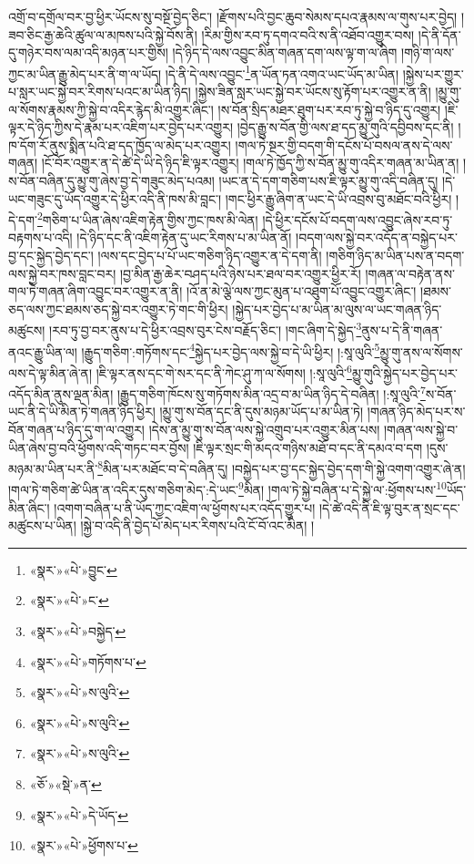 འགྲོ་བ་དགྲོལ་བར་བྱ་ཕྱིར་ཡོངས་སུ་བསྔོ་བྱེད་ཅིང་། །རྫོགས་པའི་བྱང་ཆུབ་སེམས་དཔའ་རྣམས་ལ་གུས་པར་བྱེད། །ཟབ་ཅིང་རྒྱ་ཆེའི་ཚུལ་ལ་མཁས་པའི་སྐྱེ་བོས་ནི། །རིམ་གྱིས་རབ་ཏུ་དགའ་བའི་ས་ནི་འཐོབ་འགྱུར་བས། །དེ་ནི་དོན་དུ་གཉེར་བས་ལམ་འདི་མཉན་པར་གྱིས། །དེ་ཉིད་དེ་ལས་འབྱུང་མིན་གཞན་དག་ལས་ལྟ་ག་ལ་ཞིག །གཉི་ག་ལས་ཀྱང་མ་ཡིན་རྒྱུ་མེད་པར་ནི་ག་ལ་ཡོད། །དེ་ནི་དེ་ལས་འབྱུང་\footnote{«སྣར་»«པེ་»བྱུང་}ན་ཡོན་ཏན་འགའ་ཡང་ཡོད་མ་ཡིན། །སྐྱེས་པར་གྱུར་པ་སླར་ཡང་སྐྱེ་བར་རིགས་པའང་མ་ཡིན་ཉིད། །སྐྱེས་ཟིན་སླར་ཡང་སྐྱེ་བར་ཡོངས་སུ་རྟོག་པར་འགྱུར་ན་ནི། །མྱུ་གུ་ལ་སོགས་རྣམས་ཀྱི་སྐྱེ་བ་འདིར་རྙེད་མི་འགྱུར་ཞིང་། །ས་བོན་སྲིད་མཐར་ཐུག་པར་རབ་ཏུ་སྐྱེ་བ་ཉིད་དུ་འགྱུར། །ཇི་ལྟར་དེ་ཉིད་ཀྱིས་དེ་རྣམ་པར་འཇིག་པར་བྱེད་པར་འགྱུར། །བྱེད་རྒྱུ་ས་བོན་གྱི་ལས་ཐ་དད་མྱུ་གུའི་དབྱིབས་དང་ནི། །ཁ་དོག་རོ་ནུས་སྨིན་པའི་ཐ་དད་ཁྱོད་ལ་མེད་པར་འགྱུར། །གལ་ཏེ་སྔར་གྱི་བདག་གི་དངོས་པོ་བསལ་ནས་དེ་ལས་གཞན། །ངོ་བོར་འགྱུར་ན་དེ་ཚེ་དེ་ཡི་དེ་ཉིད་ཇི་ལྟར་འགྱུར། །གལ་ཏེ་ཁྱོད་ཀྱི་ས་བོན་མྱུ་གུ་འདིར་གཞན་མ་ཡིན་ན། །ས་བོན་བཞིན་དུ་མྱུ་གུ་ཞེས་བྱ་དེ་གཟུང་མེད་པའམ། །ཡང་ན་དེ་དག་གཅིག་པས་ཇི་ལྟར་མྱུ་གུ་འདི་བཞིན་དུ། །དེ་ཡང་གཟུང་དུ་ཡོད་འགྱུར་དེ་ཕྱིར་འདི་ནི་ཁས་མི་བླང་། །གང་ཕྱིར་རྒྱུ་ཞིག་ན་ཡང་དེ་ཡི་འབྲས་བུ་མཐོང་བའི་ཕྱིར། །དེ་དག་\footnote{«སྣར་»«པེ་»ང་}གཅིག་པ་ཡིན་ཞེས་འཇིག་རྟེན་གྱིས་ཀྱང་ཁས་མི་ལེན། །དེ་ཕྱིར་དངོས་པོ་བདག་ལས་འབྱུང་ཞེས་རབ་ཏུ་བརྟགས་པ་འདི། །དེ་ཉིད་དང་ནི་འཇིག་རྟེན་དུ་ཡང་རིགས་པ་མ་ཡིན་ནོ། །བདག་ལས་སྐྱེ་བར་འདོད་ན་བསྐྱེད་པར་བྱ་དང་སྐྱེད་བྱེད་དང་། །ལས་དང་བྱེད་པ་པོ་ཡང་གཅིག་ཉིད་འགྱུར་ན་དེ་དག་ནི། །གཅིག་ཉིད་མ་ཡིན་པས་ན་བདག་ལས་སྐྱེ་བར་ཁས་བླང་བར། །བྱ་མིན་རྒྱ་ཆེར་བཤད་པའི་ཉེས་པར་ཐལ་བར་འགྱུར་ཕྱིར་རོ། །གཞན་ལ་བརྟེན་ནས་གལ་ཏེ་གཞན་ཞིག་འབྱུང་བར་འགྱུར་ན་ནི། །འོ་ན་མེ་ལྕེ་ལས་ཀྱང་མུན་པ་འཐུག་པོ་འབྱུང་འགྱུར་ཞིང་། །ཐམས་ཅད་ལས་ཀྱང་ཐམས་ཅད་སྐྱེ་བར་འགྱུར་ཏེ་གང་གི་ཕྱིར། །སྐྱེད་པར་བྱེད་པ་མ་ཡིན་མ་ལུས་ལ་ཡང་གཞན་ཉིད་མཚུངས། །རབ་ཏུ་བྱ་བར་ནུས་པ་དེ་ཕྱིར་འབྲས་བུར་ངེས་བརྗོད་ཅིང་། །གང་ཞིག་དེ་སྐྱེད་\footnote{«སྣར་»«པེ་»བསྐྱེད་}ནུས་པ་དེ་ནི་གཞན་ནའང་རྒྱུ་ཡིན་ལ། །རྒྱུད་གཅིག་:གཏོགས་དང་\footnote{«སྣར་»«པེ་»གཏོགས་པ་}སྐྱེད་པར་བྱེད་ལས་སྐྱེ་བ་དེ་ཡི་ཕྱིར། །:སཱ་ལུའི་\footnote{«སྣར་»«པེ་»ས་ལུའི་}མྱུ་གུ་ནས་ལ་སོགས་ལས་དེ་ལྟ་མིན་ཞེ་ན། །ཇི་ལྟར་ནས་དང་གེ་སར་དང་ནི་ཀེང་ཤུ་ཀ་ལ་སོགས། །:སཱ་ལུའི་\footnote{«སྣར་»«པེ་»ས་ལུའི་}མྱུ་གུའི་སྐྱེད་པར་བྱེད་པར་འདོད་མིན་ནུས་ལྡན་མིན། །རྒྱུད་གཅིག་ཁོངས་སུ་གཏོགས་མིན་འདྲ་བ་མ་ཡིན་ཉིད་དེ་བཞིན། །:སཱ་ལུའི་\footnote{«སྣར་»«པེ་»ས་ལུའི་}ས་བོན་ཡང་ནི་དེ་ཡི་མིན་ཏེ་གཞན་ཉིད་ཕྱིར། །མྱུ་གུ་ས་བོན་དང་ནི་དུས་མཉམ་ཡོད་པ་མ་ཡིན་ཏེ། །གཞན་ཉིད་མེད་པར་ས་བོན་གཞན་པ་ཉིད་དུ་ག་ལ་འགྱུར། །དེས་ན་མྱུ་གུ་ས་བོན་ལས་སྐྱེ་འགྲུབ་པར་འགྱུར་མིན་པས། །གཞན་ལས་སྐྱེ་བ་ཡིན་ཞེས་བྱ་བའི་ཕྱོགས་འདི་གཏང་བར་བྱོས། །ཇི་ལྟར་སྲང་གི་མདའ་གཉིས་མཐོ་བ་དང་ནི་དམའ་བ་དག །དུས་མཉམ་མ་ཡིན་པར་ནི་\footnote{«ཅོ་»«སྡེ་»ན་}མིན་པར་མཐོང་བ་དེ་བཞིན་དུ། །བསྐྱེད་པར་བྱ་དང་སྐྱེད་བྱེད་དག་གི་སྐྱེ་འགག་འགྱུར་ཞེ་ན། །གལ་ཏེ་གཅིག་ཚེ་ཡིན་ན་འདིར་དུས་གཅིག་མེད་:དེ་ཡང་\footnote{«སྣར་»«པེ་»དེ་ཡོད་}མིན། །གལ་ཏེ་སྐྱེ་བཞིན་པ་དེ་སྐྱེ་ལ་:ཕྱོགས་པས་\footnote{«སྣར་»«པེ་»ཕྱོགས་པ་}ཡོད་མིན་ཞིང་། །འགག་བཞིན་པ་ནི་ཡོད་ཀྱང་འཇིག་ལ་ཕྱོགས་པར་འདོད་གྱུར་པ། །དེ་ཚེ་འདི་ནི་ཇི་ལྟ་བུར་ན་སྲང་དང་མཚུངས་པ་ཡིན། །སྐྱེ་བ་འདི་ནི་བྱེད་པོ་མེད་པར་རིགས་པའི་ངོ་བོ་འང་མིན། །
